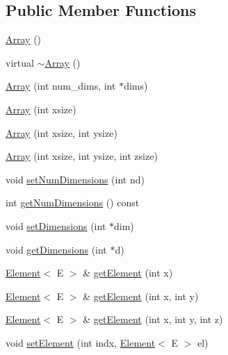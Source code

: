 \subsection*{Public Member Functions}
\begin{DoxyCompactItemize}
\item 
\hyperlink{classbridges_1_1_array_a958421b86ff55303b5fc7d505109f9fe}{Array} ()
\item 
virtual \hyperlink{classbridges_1_1_array_aa80b2d2ebc4c27e74a8eaaeb6907b474}{$\sim$\+Array} ()
\item 
\hyperlink{classbridges_1_1_array_a25ff771f9ba7f365465f309ed2dd3688}{Array} (int num\+\_\+dims, int $\ast$dims)
\item 
\hyperlink{classbridges_1_1_array_a0a475058b73b938f0fd3f577365aca89}{Array} (int xsize)
\item 
\hyperlink{classbridges_1_1_array_a13b26fc4d2ccb19b277b2acc615efce2}{Array} (int xsize, int ysize)
\item 
\hyperlink{classbridges_1_1_array_a3504e71cacffd343edf8b9ea16f75eb4}{Array} (int xsize, int ysize, int zsize)
\item 
void \hyperlink{classbridges_1_1_array_a6b91612bb7b89a563571fd1ea417ef2a}{set\+Num\+Dimensions} (int nd)
\item 
int \hyperlink{classbridges_1_1_array_a14dbc2f6478b9b75dfa7c91f67afb90e}{get\+Num\+Dimensions} () const 
\item 
void \hyperlink{classbridges_1_1_array_a4e179915ab7820bbafe9b3433656b182}{set\+Dimensions} (int $\ast$dim)
\item 
void \hyperlink{classbridges_1_1_array_ae195a6f06157e82c68483ff636e30f5e}{get\+Dimensions} (int $\ast$d)
\item 
\hyperlink{classbridges_1_1_element}{Element}$<$ E $>$ \& \hyperlink{classbridges_1_1_array_a8b4c6cc491829d814e0b6b0ce3654417}{get\+Element} (int x)
\item 
\hyperlink{classbridges_1_1_element}{Element}$<$ E $>$ \& \hyperlink{classbridges_1_1_array_acd5e730e0369b1fa699a5907e889f213}{get\+Element} (int x, int y)
\item 
\hyperlink{classbridges_1_1_element}{Element}$<$ E $>$ \& \hyperlink{classbridges_1_1_array_a7006eeac547c391cb7e8eb19c56ae9f6}{get\+Element} (int x, int y, int z)
\item 
void \hyperlink{classbridges_1_1_array_aae8ec0bd850e00593487022bc914afe0}{set\+Element} (int indx, \hyperlink{classbridges_1_1_element}{Element}$<$ E $>$ el)
\item 

\end{DoxyCompactItemize}
